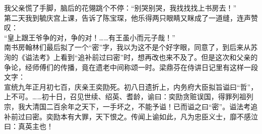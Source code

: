 我父亲慌了手脚，脑后的花翎跳个不停：“别哭别哭，我找找找上书房去！”\\

第二天我到毓庆宫上课，告诉了陈宝琛，他乐得两只眼睛又眯成了一道缝，连声赞叹：\\

“皇上跟王爷争的对，争的对！……有王虽小而元子哉！”\\

南书房翰林们最后拟了一个“密”字，我以为这不是个好字眼，同意了，到后来从苏洵的《谥法考》上看到“追补前过曰密”时，想再改也来不及了。但是这次和父亲的争论，经师傅们的传播，竟在遗老中间称颂一时。梁鼎芬在侍讲日记里有这样一段文字：\\

宣统九年正月初七百，庆亲王奕劻死。初八日遗折上，内务府大臣拟旨谥曰“哲”，上不可。……初十日，召见世续、绍英、耆龄，谕曰：奕劻贪赃误国，得罪列祖列宗，我大清国二百余年之天下，一手坏之，不能予谥！已而谥之曰“密”。谥法考追补前过曰密。奕劻本有大罪，天下恨之。传闻上谕如此，凡为忠臣义士，靡不感泣曰：真英主也！\\